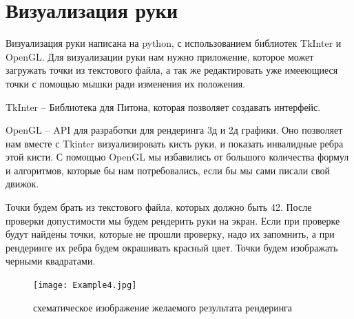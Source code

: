 \section{Визуализация руки}

\hspace{0.6cm} Визуализация руки написана на python, с использованием библиотек TkInter и OpenGL. Для визуализации руки нам нужно приложение, которое может загружать точки из текстового файла, а так же редактировать уже имееющиеся точки с помощью мышки ради изменения их положения.

\hspace{0.6cm} TkInter – Библиотека для Питона, которая позволяет создавать интерфейс.

\hspace{0.6cm} OpenGL – API для разработки для рендеринга 3д и 2д графики. Оно позволяет нам вместе с Tkinter визуализировать кисть руки, и показать инвалидные ребра этой кисти. С помощью OpenGL мы избавились от большого количества формул и алгоритмов, которые бы нам потребовались, если бы мы сами писали свой движок.

\hspace{0.6cm} Точки будем брать из текстового файла, которых должно быть 42. После проверки допустимости мы будем рендерить руки на экран. Если при проверке будут найдены точки, которые не прошли проверку, надо их запомнить, а при рендеринге их ребра будем окрашивать красный цвет. Точки будем изображать черными квадратами.

\begin{figure}[ht!]
	\centering
	\texttt{[image: Example4.jpg]}
	\caption{схематическое изображение желаемого результата рендеринга}
	\label{fig:example4}
\end{figure}
	

